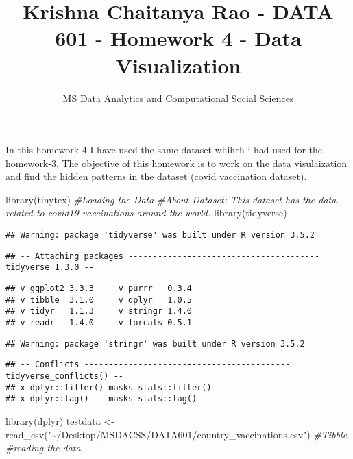 \documentclass[
]{article}
\title{Krishna Chaitanya Rao - DATA 601 - Homework 4 - Data
Visualization}
\author{MS Data Analytics and Computational Social Sciences}
\date{}
\newenvironment{Shaded}{\begin{snugshade}}{\end{snugshade}}
\newcommand{\CommentTok}[1]{\textcolor[rgb]{0.56,0.35,0.01}{\textit{#1}}}
\newcommand{\FunctionTok}[1]{\textcolor[rgb]{0.00,0.00,0.00}{#1}}
\newcommand{\NormalTok}[1]{#1}
\newcommand{\OtherTok}[1]{\textcolor[rgb]{0.56,0.35,0.01}{#1}}
\newcommand{\StringTok}[1]{\textcolor[rgb]{0.31,0.60,0.02}{#1}}
\begin{document}
\maketitle

In this homework-4 I have used the same dataset whihch i had used for
the homework-3. The objective of this homework is to work on the data
visulaization and find the hidden patterns in the dataset (covid
vaccination dataset).

\begin{Shaded}
\begin{Highlighting}[]
\FunctionTok{library}\NormalTok{(tinytex)}
\CommentTok{\#Loading the Data}
\CommentTok{\#About Dataset: This dataset has the data related to covid19 vaccinations around the world.}
\FunctionTok{library}\NormalTok{(tidyverse)}
\end{Highlighting}
\end{Shaded}

\begin{verbatim}
## Warning: package 'tidyverse' was built under R version 3.5.2
\end{verbatim}

\begin{verbatim}
## -- Attaching packages --------------------------------------- tidyverse 1.3.0 --
\end{verbatim}

\begin{verbatim}
## v ggplot2 3.3.3     v purrr   0.3.4
## v tibble  3.1.0     v dplyr   1.0.5
## v tidyr   1.1.3     v stringr 1.4.0
## v readr   1.4.0     v forcats 0.5.1
\end{verbatim}

\begin{verbatim}
## Warning: package 'stringr' was built under R version 3.5.2
\end{verbatim}

\begin{verbatim}
## -- Conflicts ------------------------------------------ tidyverse_conflicts() --
## x dplyr::filter() masks stats::filter()
## x dplyr::lag()    masks stats::lag()
\end{verbatim}

\begin{Shaded}
\begin{Highlighting}[]
\FunctionTok{library}\NormalTok{(dplyr)}
\NormalTok{testdata }\OtherTok{\textless{}{-}}  \FunctionTok{read\_csv}\NormalTok{(}\StringTok{"\textasciitilde{}/Desktop/MSDACSS/DATA601/country\_vaccinations.csv"}\NormalTok{) }\CommentTok{\#Tibble \#reading the data}
\end{Highlighting}
\end{Shaded}
\end{document}
